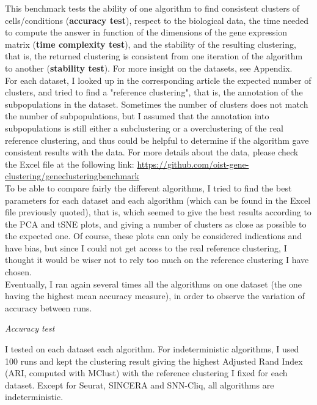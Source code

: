 \documentclass{report}
\begin{document}
This benchmark tests the ability of one algorithm to find consistent clusters of cells/conditions (\textbf{accuracy test}), respect to the biological data, the time needed to compute the answer in function of the dimensions of the gene expression matrix (\textbf{time complexity test}), and the stability of the resulting clustering, that is, the returned clustering is consistent from one iteration of the algorithm to another (\textbf{stability test}). For more insight on the datasets, see Appendix.\\

For each dataset, I looked up in the corresponding article the expected number of clusters, and tried to find a "reference clustering", that is, the annotation of the subpopulations in the dataset. Sometimes the number of clusters does not match the number of subpopulations, but I assumed that the annotation into subpopulations is still either a subclustering or a overclustering of the real reference clustering, and thus could be helpful to determine if the algorithm gave consistent results with the data. For more details about the data, please check the Excel file at the following link: {\url{https://github.com/oist-gene-clustering/geneclusteringbenchmark}}\\ 

To be able to compare fairly the different algorithms, I tried to find the best parameters for each dataset and each algorithm (which can be found in the Excel file previously quoted), that is, which seemed to give the best results according to the PCA and tSNE plots, and giving a number of clusters as close as possible to the expected one. Of course, these plots can only be considered indications and have bias, but since I could not get access to the real reference clustering, I thought it would be wiser not to rely too much on the reference clustering I have chosen.\\

Eventually, I ran again several times all the algorithms on one dataset (the one having the highest mean accuracy measure), in order to observe the variation of accuracy between runs.

\bigskip
\noindent \textit{Accuracy test}
\bigskip

I tested on each dataset each algorithm. For indeterministic algorithms, I used 100 runs and kept the clustering result giving the highest Adjusted Rand Index\cite{rand1971objective} (ARI, computed with MClust\cite{fraley1999mclust}) with the reference clustering I fixed for each dataset. Except for Seurat, SINCERA and SNN-Cliq, all algorithms are indeterministic. 
\end{document}
